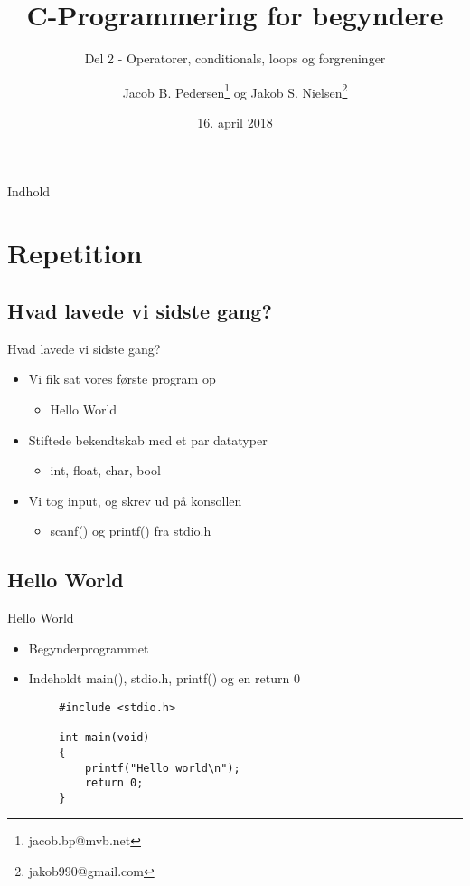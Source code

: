 \documentclass{beamer}
\title{C-Programmering for begyndere}
\date{16. april 2018}
\subtitle{Del 2 - Operatorer, conditionals, loops og forgreninger}
\author{Jacob B. Pedersen\footnote{jacob.bp@mvb.net} og Jakob S. Nielsen\footnote{jakob990@gmail.com}}
\begin{document}
\begin{frame}
	\maketitle
\end{frame}

\begin{frame}{Indhold}
	\tableofcontents
\end{frame}

\section{Repetition}
\subsection{Hvad lavede vi sidste gang?}

\begin{frame}{Hvad lavede vi sidste gang?}
	\begin{itemize}
		\item{Vi fik sat vores første program op}
		\begin{itemize}
			\item{Hello World}
		\end{itemize}
		\item{Stiftede bekendtskab med et par datatyper}
		\begin{itemize}
			\item{{\color{C_darkblue}int}, {\color{C_darkblue}float}, {\color{C_darkblue}char}, {\color{C_darkblue}bool}}
		\end{itemize}
		\item{Vi tog input, og skrev ud på konsollen}
		\begin{itemize}
			\item{{\color{C_darkblue}scanf}() og {\color{C_darkblue}printf}() fra {\color{C_lightblue}stdio.h}}
		\end{itemize}
	\end{itemize}
\end{frame}

\subsection{Hello World}

\begin{frame}[fragile]{Hello World}
	\begin{itemize}
		\item{Begynderprogrammet}
		\item{Indeholdt {\color{C_darkblue}main}(), {\color{C_lightblue}stdio.h}, {\color{C_darkblue}printf}() og en {\color{C_darkblue}return} 0}
	\end{itemize}
		\begin{lstlisting}
		#include <stdio.h>

		int main(void)
		{
			printf("Hello world\n");
			return 0;
		}
		\end{lstlisting}
\end{frame}
\end{document}
